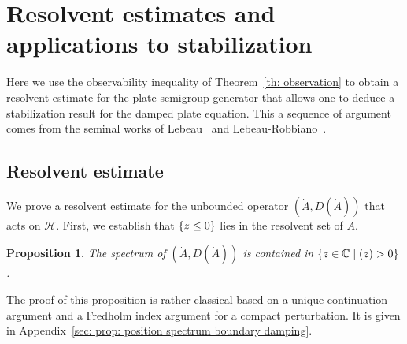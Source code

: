 \documentclass[10pt]{amsart}
\let\sep\mid
\theoremstyle{plain}
\newtheorem{proposition}[theorem]{Proposition}
\theoremstyle{definition}
\def\C{\mathbb{C}}
\let \Re \relax
\DeclareMathOperator{\Re}{Re}
\renewcommand{\H}{{\mathcal H}}
\begin{document}
\section{Resolvent estimates and applications to
stabilization}
\label{sec:resolvent, stab}
Here we use the observability inequality of Theorem~\ref{th: observation}
to obtain a resolvent estimate for the plate
semigroup generator that allows one to deduce a stabilization result
for the damped plate equation. This a sequence of argument comes from
the seminal works of Lebeau~\cite{Lebeau:96} and
Lebeau-Robbiano~\cite{LR:97}.

\subsection{Resolvent estimate}
\label{sec: Resolvent estimate}
We prove a resolvent estimate for the unbounded operator $(\dot{A}, D (\dot{A}))$ that
acts on $\dot{\H}$. First, we establish that $\{ \Re z \leq 0\}$ lies in the
resolvent set of $\dot{A}$.

\begin{proposition}
\label{prop: position spectrum boundary damping}
The spectrum of $(\dot{A}, D (\dot{A}))$ is contained in $\{ z \in \C\sep \Re (z) >0\}$.
\end{proposition}
The proof of this proposition is rather classical based on a unique
continuation argument and a Fredholm index argument for a compact
perturbation. It is given in Appendix~\ref{sec: prop:
position spectrum boundary damping}.
\end{document}
